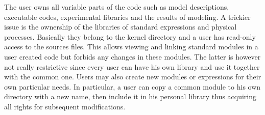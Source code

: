 The user owns all variable parts of the code such as model descriptions, 
executable codes, experimental libraries and the results of modeling.
A trickier issue is the ownership of the libraries of standard
expressions and physical processes.
Basically they belong to the kernel directory and a user has read-only
access to the sources files.
This allows viewing and linking standard modules in a user created code
but forbids any changes in these modules.
The latter is however not really restrictive since every user
can have his own library and use it together with the common one.
Users may also create new modules or expressions for their own
particular needs. 
In particular, a user can copy a common module to his own directory 
with a new name, then include it in his personal library 
thus acquiring all rights for subsequent modifications. 

